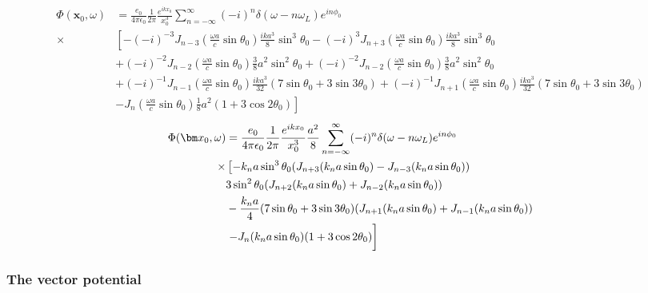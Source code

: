 \begin{align}
    \Phi({\bm x}_0,\omega) & =\frac{e_0}{4\pi\epsilon_0}\frac1{2\pi}\frac{e^{ikx_0}}{x_0^3}\sum_{n=-\infty}^{\infty} (-i)^n \delta(\omega-n\omega_L)e^{in\phi_0}\nonumber                                                                  \\
    \times                 & \left[ -(-i)^{-3}J_{n-3}(\frac{\omega a}c\sin\theta_0)\frac{ika^3}8\sin^3\theta_0-(-i)^3J_{n+3}(\frac{\omega a}c\sin\theta_0)\frac{ika^3}8\sin^3\theta_0\nonumber                                     \right. \\
                           & +(-i)^{-2}J_{n-2}(\frac{\omega a}c\sin\theta_0)\frac38a^2\sin^2\theta_0+(-i)^{-2}J_{n-2}(\frac{\omega a}c\sin\theta_0)\frac38a^2\sin^2\theta_0\nonumber                                                       \\
                           & +(-i)^{-1}J_{n-1}(\frac{\omega a}c\sin\theta_0)\frac{ika^3}{32}(7\sin\theta_0+3\sin3\theta_0)+(-i)^{-1}J_{n+1}(\frac{\omega a}c\sin\theta_0)\frac{ika^3}{32}(7\sin\theta_0+3\sin3\theta_0)\nonumber           \\
                           & \left.-J_{n}(\frac{\omega a}c\sin\theta_0)\frac18a^2(1+3\cos 2\theta_0)\right]
\end{align}
\begin{align}
    \Phi({\bm x}_0,\omega) & =\frac{e_0}{4\pi\epsilon_0}\frac1{2\pi}\frac{e^{ikx_0}}{x_0^3}\frac{a^2}8\sum_{n=-\infty}^{\infty} (-i)^n \delta(\omega-n\omega_L)e^{in\phi_0}\nonumber \\
    \times                 & \left[-{k_na}\sin^3\theta_0(J_{n+3}(k_na\sin\theta_0)-J_{n-3}(k_na\sin\theta_0))\nonumber                                     \right.                   \\
                           & 3\sin^2\theta_0(J_{n+2}(k_na\sin\theta_0)+J_{n-2}(k_na\sin\theta_0))\nonumber                                                                           \\
                           & -\frac{k_na}{4}(7\sin\theta_0+3\sin3\theta_0)(J_{n+1}(k_na\sin\theta_0)+J_{n-1}(k_na\sin\theta_0))\nonumber                                             \\
                           & \left.-J_{n}(k_na\sin\theta_0)(1+3\cos 2\theta_0)\vphantom{\frac12}\right]
\end{align}

\subsubsection{The vector potential}

